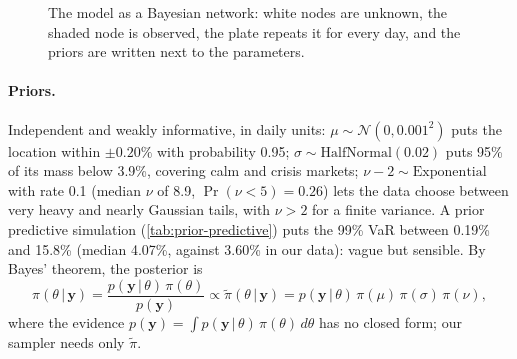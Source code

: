 \documentclass[12pt]{article}
\newcommand{\by}{\mathbf{y}}
\newcommand{\given}{\,\vert\,}
\begin{document}
\begin{figure}[ht]
  \centering
  \caption{The model as a Bayesian network: white nodes are unknown, the shaded node is observed, the plate repeats it for every day, and the priors are written next to the parameters.}
  \label{fig:dag}
\end{figure}

\paragraph{Priors.} Independent and weakly informative, in daily units: $\mu \sim \mathcal N(0, 0.001^2)$ puts the location within $\pm 0.20\%$ with probability 0.95; $\sigma \sim \mathrm{HalfNormal}(0.02)$ puts 95\% of its mass below 3.9\%, covering calm and crisis markets; $\nu - 2 \sim \mathrm{Exponential}$ with rate 0.1 (median $\nu$ of 8.9, $\Pr(\nu < 5) = 0.26$) lets the data choose between very heavy and nearly Gaussian tails, with $\nu > 2$ for a finite variance. A prior predictive simulation (\cref{tab:prior-predictive}) puts the 99\% VaR between 0.19\% and 15.8\% (median 4.07\%, against 3.60\% in our data): vague but sensible. By Bayes' theorem, the posterior is
\begin{equation}\label{eq:posterior}
  \pi(\theta\given\by) = \frac{p(\by\given\theta)\,\pi(\theta)}{p(\by)} \propto \tilde\pi(\theta \given \by) = p(\by\given\theta)\,\pi(\mu)\,\pi(\sigma)\,\pi(\nu),
\end{equation}
where the evidence $p(\by) = \int p(\by\given\theta)\,\pi(\theta)\,d\theta$ has no closed form; our sampler needs only $\tilde\pi$.
\end{document}
